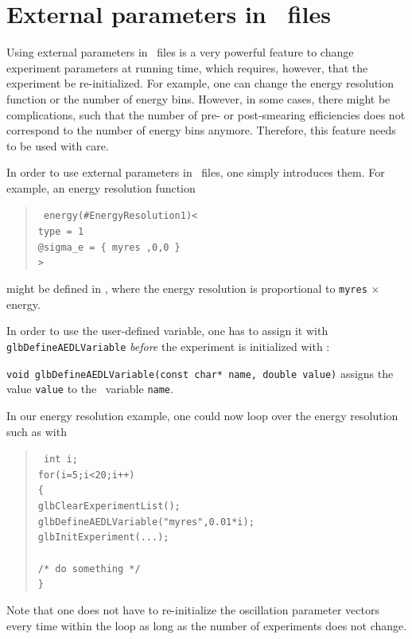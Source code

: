 \section{External parameters in \AEDL\ files}
\label{sec:aedlparams}

Using external parameters in \AEDL\ files is a very powerful feature
to change experiment parameters at running time, which requires, however, that
the experiment be re-initialized. For example, one can change the
energy resolution function or the number of energy bins. However,
in some cases, there might be complications, such that the number
of pre- or post-smearing efficiencies does not correspond to the number
of energy bins anymore. Therefore, this feature needs to be 
used with care.

In order to use external parameters in \AEDL\ files, one simply
introduces them. For example, an energy resolution function
\begin{quote}
{\tt
energy(\#EnergyResolution1)< \\
\hspace*{1cm} type = 1 \\
\hspace*{1cm} @sigma\_e = \{ myres ,0,0 \} \\
> \\
}
\end{quote}
might be defined in \AEDL , where the energy resolution is proportional
to {\tt myres} $\times$ energy. 

In order to use the user-defined variable, one has to assign it 
with {\tt glbDefineAEDLVariable} {\em before} the experiment is initialized with :
\begin{function}
{\tt void glbDefineAEDLVariable(const char* name, double value)}
assigns the value {\tt value} to the \AEDL\ variable {\tt name}.
\end{function}
In our energy resolution example, one could now loop over the
energy resolution such as with
\begin{quote}
{\tt
int i; \\
for(i=5;i<20;i++) \\
\{ \\    
\hspace*{1cm} glbClearExperimentList(); \\
\hspace*{1cm} glbDefineAEDLVariable("myres",0.01*i); \\
\hspace*{1cm} glbInitExperiment(...); \\
\\
\hspace*{1cm} /* do something */ \\
\}
}
\end{quote}
Note that one does not have to re-initialize the oscillation
parameter vectors every time within the loop as long as the
number of experiments does not change.

